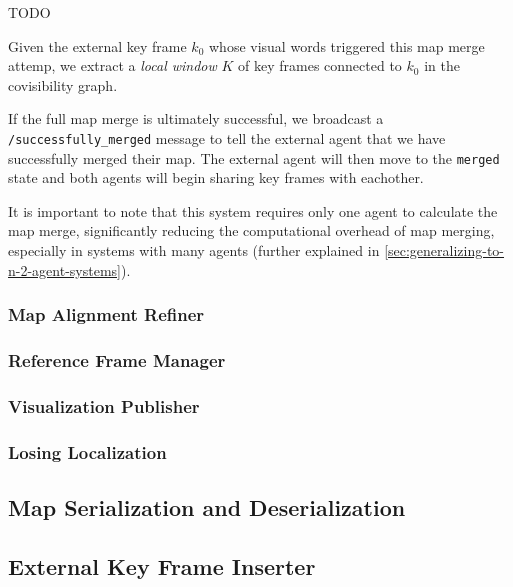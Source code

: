 TODO

Given the external key frame $k_0$ whose visual words triggered this map merge attemp, we extract a \textit{local window} $K$ of key frames connected to $k_0$ in the covisibility graph.

If the full map merge is ultimately successful, we broadcast a \texttt{/successfully\_merged} message to tell the external agent that we have successfully merged their map. The external agent will then move to the \texttt{merged} state and both agents will begin sharing key frames with eachother.

It is important to note that this system requires only one agent to calculate the map merge, significantly reducing the computational overhead of map merging, especially in systems with many agents (further explained in \autoref{sec:generalizing-to-n-2-agent-systems}).

\subsubsection{Map Alignment Refiner}
\label{sec:map-alignment-refiner}

\subsubsection{Reference Frame Manager}
\label{sec:reference-frame-manager}

\subsubsection{Visualization Publisher}
\label{sec:visualization-publisher}

\subsubsection{Losing Localization}
\label{sec:losing-localization}

\subsection{Map Serialization and Deserialization}
\label{sec:map-serialization-and-deserialization}

\subsection{External Key Frame Inserter}
\label{sec:external-key-frame-inserter}

